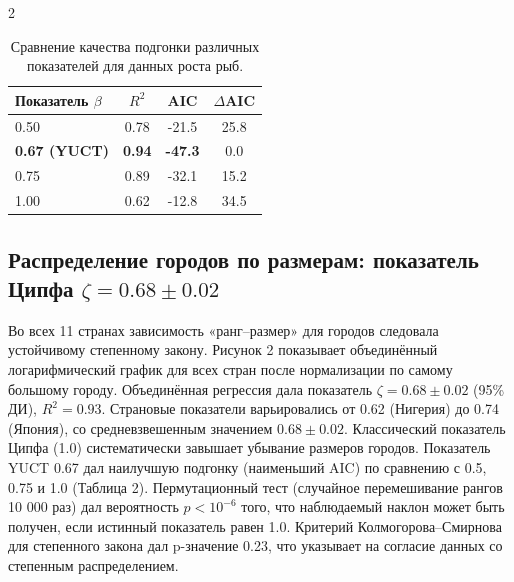 \documentclass[11pt,a4paper]{article}
\begin{document}
\begin{multicols}{2}
		\begin{table}[htbp]
			\centering
			\caption{Сравнение качества подгонки различных показателей для данных роста рыб.}
			\label{tab:comparison_fish}
			\begin{tabular}{lccc}
				\toprule
				\textbf{Показатель \(\beta\)} & \(R^2\) & AIC & \(\Delta\)AIC \\
				\midrule
				0.50 & 0.78 & -21.5 & 25.8 \\
				\textbf{0.67 (YUCT)} & \textbf{0.94} & \textbf{-47.3} & 0.0 \\
				0.75 & 0.89 & -32.1 & 15.2 \\
				1.00 & 0.62 & -12.8 & 34.5 \\
				\bottomrule
			\end{tabular}
		\end{table}
		
		\subsection{Распределение городов по размерам: показатель Ципфа \(\zeta = 0.68 \pm 0.02\)}
		
		Во всех 11 странах зависимость «ранг–размер» для городов следовала устойчивому степенному закону. Рисунок 2 показывает объединённый логарифмический график для всех стран после нормализации по самому большому городу. Объединённая регрессия дала показатель \(\zeta = 0.68 \pm 0.02\) (95\% ДИ), \(R^2 = 0.93\). Страновые показатели варьировались от 0.62 (Нигерия) до 0.74 (Япония), со средневзвешенным значением \(0.68 \pm 0.02\). Классический показатель Ципфа (1.0) систематически завышает убывание размеров городов. Показатель YUCT 0.67 дал наилучшую подгонку (наименьший AIC) по сравнению с 0.5, 0.75 и 1.0 (Таблица 2). Пермутационный тест (случайное перемешивание рангов 10 000 раз) дал вероятность \(p < 10^{-6}\) того, что наблюдаемый наклон может быть получен, если истинный показатель равен 1.0. Критерий Колмогорова–Смирнова для степенного закона дал p-значение 0.23, что указывает на согласие данных со степенным распределением.
		

\end{multicols}
\end{document}
